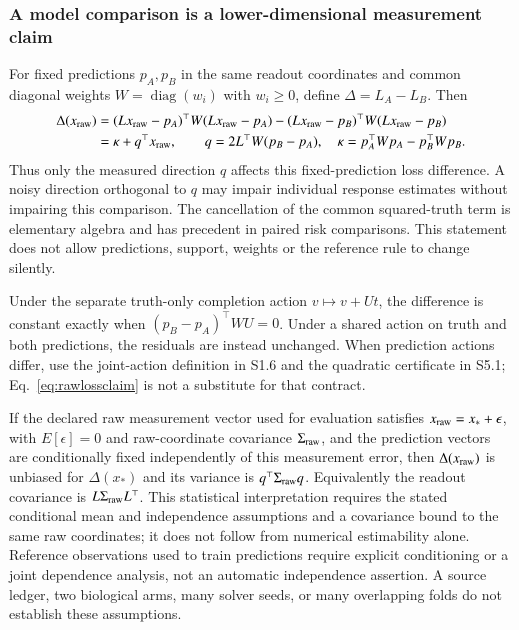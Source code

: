 \documentclass[11pt]{article}
\begin{document}
\subsubsection{A model comparison is a lower-dimensional measurement claim}
For fixed predictions $p_A,p_B$ in the same readout coordinates and common diagonal weights $W=\operatorname{diag}(w_i)$ with $w_i\geq0$, define $\Delta=L_A-L_B$. Then
\begin{align}
\Delta(x_{\rm raw})&=(Lx_{\rm raw}-p_A)^\top W(Lx_{\rm raw}-p_A)-(Lx_{\rm raw}-p_B)^\top W(Lx_{\rm raw}-p_B)\\
&=\kappa+q^\top x_{\rm raw},\qquad
q=2L^\top W(p_B-p_A),\quad
\kappa=p_A^\top Wp_A-p_B^\top Wp_B.
\label{eq:rawlossclaim}
\end{align}
Thus only the measured direction $q$ affects this fixed-prediction loss difference. A noisy direction orthogonal to $q$ may impair individual response estimates without impairing this comparison. The cancellation of the common squared-truth term is elementary algebra and has precedent in paired risk comparisons. This statement does not allow predictions, support, weights or the reference rule to change silently.

Under the separate truth-only completion action $v\mapsto v+Ut$, the difference is constant exactly when $(p_B-p_A)^\top WU=0$. Under a shared action on truth and both predictions, the residuals are instead unchanged. When prediction actions differ, use the joint-action definition in S1.6 and the quadratic certificate in S5.1; Eq.~\ref{eq:rawlossclaim} is not a substitute for that contract.

If the declared raw measurement vector used for evaluation satisfies $x_{\rm raw}=x_*+\epsilon$, with $E[\epsilon]=0$ and raw-coordinate covariance $\Sigma_{\rm raw}$, and the prediction vectors are conditionally fixed independently of this measurement error, then $\Delta(x_{\rm raw})$ is unbiased for $\Delta(x_*)$ and its variance is $q^\top\Sigma_{\rm raw} q$. Equivalently the readout covariance is $L\Sigma_{\rm raw} L^\top$. This statistical interpretation requires the stated conditional mean and independence assumptions and a covariance bound to the same raw coordinates; it does not follow from numerical estimability alone. Reference observations used to train predictions require explicit conditioning or a joint dependence analysis, not an automatic independence assertion. A source ledger, two biological arms, many solver seeds, or many overlapping folds do not establish these assumptions.
\end{document}
